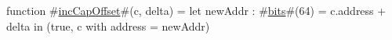 function #\hyperref[zincCapOffset]{incCapOffset}#(c, delta) =
    let newAddr : #\hyperref[zbits]{bits}#(64) = c.address + delta in
    (true, {c with address = newAddr})
